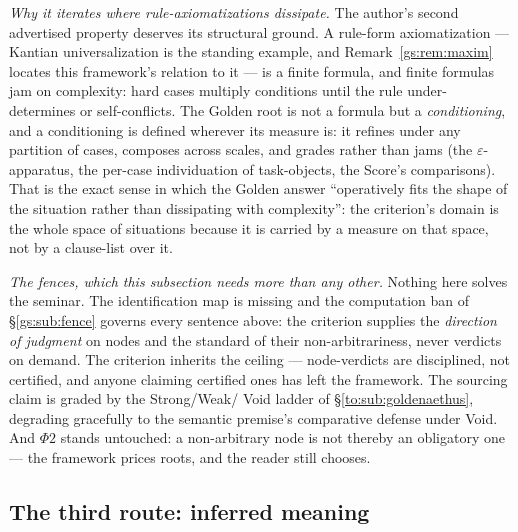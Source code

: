 \documentclass[11pt]{article}
\numberwithin{equation}{section}
\theoremstyle{plain}
\theoremstyle{definition}
\theoremstyle{remark}
\begin{document}
\emph{Why it iterates where rule-axiomatizations dissipate.} The
author's second advertised property deserves its structural ground. A
rule-form axiomatization --- Kantian universalization is the standing
example, and Remark~\ref{gs:rem:maxim} locates this framework's
relation to it --- is a finite formula, and finite formulas jam on
complexity: hard cases multiply conditions until the rule
under-determines or self-conflicts. The Golden root is not a formula
but a \emph{conditioning}, and a conditioning is defined wherever its
measure is: it refines under any partition of cases, composes across
scales, and grades rather than jams (the $\varepsilon$-apparatus, the
per-case individuation of task-objects, the Score's comparisons). That
is the exact sense in which the Golden answer ``operatively fits the
shape of the situation rather than dissipating with complexity'': the
criterion's domain is the whole space of situations because it is
carried by a measure on that space, not by a clause-list over it.

\emph{The fences, which this subsection needs more than any other.}
Nothing here solves the seminar. The identification map is missing and
the computation ban of \S\ref{gs:sub:fence} governs every sentence
above: the criterion supplies the \emph{direction of judgment} on
nodes and the standard of their non-arbitrariness, never verdicts on
demand. The criterion inherits the ceiling --- node-verdicts are
disciplined, not certified, and anyone claiming certified ones has
left the framework. The sourcing claim is graded by the Strong/Weak/
Void ladder of \S\ref{to:sub:goldenaethus}, degrading gracefully to
the semantic premise's comparative defense under Void. And $\Phi2$
stands untouched: a non-arbitrary node is not thereby an obligatory
one --- the framework prices roots, and the reader still chooses.

\subsection{The third route: inferred meaning}\label{gs:sub:thirdroute}
\end{document}
